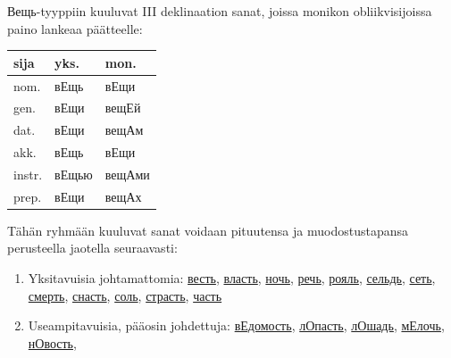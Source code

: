 \documentclass[]{scrreprt}
\providecommand{\tightlist}{%
  \setlength{\itemsep}{0pt}\setlength{\parskip}{0pt}}
\begin{document}
Вещь-tyyppiin kuuluvat III deklinaation sanat, joissa monikon
obliikvisijoissa paino lankeaa päätteelle:

\begin{longtable}[c]{@{}lll@{}}
\toprule
sija & yks. & mon.\tabularnewline
\midrule
\endhead
nom. & вЕщь & вЕщи\tabularnewline
gen. & вЕщи & вещЕй\tabularnewline
dat. & вЕщи & вещАм\tabularnewline
akk. & вЕщь & вЕщи\tabularnewline
instr. & вЕщью & вещАми\tabularnewline
prep. & вЕщи & вещАх\tabularnewline
\bottomrule
\end{longtable}

Tähän ryhmään kuuluvat sanat voidaan pituutensa ja muodostustapansa
perusteella jaotella seuraavasti:

\begin{enumerate}
\def\labelenumi{\arabic{enumi}.}
\tightlist
\item
  Yksitavuisia johtamattomia:
  \href{http://ru.wiktionary.org/wiki/\%D0\%B2\%D0\%B5\%D1\%81\%D1\%82\%D1\%8C}{весть},
  \href{http://ru.wiktionary.org/wiki/\%D0\%B2\%D0\%BB\%D0\%B0\%D1\%81\%D1\%82\%D1\%8C}{власть},
  \href{http://ru.wiktionary.org/wiki/\%D0\%BD\%D0\%BE\%D1\%87\%D1\%8C}{ночь},
  \href{http://ru.wiktionary.org/wiki/\%D1\%80\%D0\%B5\%D1\%87\%D1\%8C}{речь},
  \href{http://ru.wiktionary.org/wiki/\%D1\%80\%D0\%BE\%D1\%8F\%D0\%BB\%D1\%8C}{рояль},
  \href{http://ru.wiktionary.org/wiki/\%D1\%81\%D0\%B5\%D0\%BB\%D1\%8C\%D0\%B4\%D1\%8C}{сельдь},
  \href{http://ru.wiktionary.org/wiki/\%D1\%81\%D0\%B5\%D1\%82\%D1\%8C}{сеть},
  \href{http://ru.wiktionary.org/wiki/\%D1\%81\%D0\%BC\%D0\%B5\%D1\%80\%D1\%82\%D1\%8C}{смерть},
  \href{http://ru.wiktionary.org/wiki/\%D1\%81\%D0\%BD\%D0\%B0\%D1\%81\%D1\%82\%D1\%8C}{снасть},
  \href{http://ru.wiktionary.org/wiki/\%D1\%81\%D0\%BE\%D0\%BB\%D1\%8C}{соль},
  \href{http://ru.wiktionary.org/wiki/\%D1\%81\%D1\%82\%D1\%80\%D0\%B0\%D1\%81\%D1\%82\%D1\%8C}{страсть},
  \href{http://ru.wiktionary.org/wiki/\%D1\%87\%D0\%B0\%D1\%81\%D1\%82\%D1\%8C}{часть}
\item
  Useampitavuisia, pääosin johdettuja:
  \href{http://ru.wiktionary.org/wiki/\%D0\%B2\%D0\%B5\%D0\%B4\%D0\%BE\%D0\%BC\%D0\%BE\%D1\%81\%D1\%82\%D1\%8C}{вЕдомость},
  \href{http://ru.wiktionary.org/wiki/\%D0\%BB\%D0\%BE\%D0\%BF\%D0\%B0\%D1\%81\%D1\%82\%D1\%8C}{лОпасть},
  \href{http://ru.wiktionary.org/wiki/\%D0\%BB\%D0\%BE\%D1\%88\%D0\%B0\%D0\%B4\%D1\%8C}{лОшадь},
  \href{http://ru.wiktionary.org/wiki/\%D0\%BC\%D0\%B5\%D0\%BB\%D0\%BE\%D1\%87\%D1\%8C}{мЕлочь},
  \href{http://ru.wiktionary.org/wiki/\%D0\%BD\%D0\%BE\%D0\%B2\%D0\%BE\%D1\%81\%D1\%82\%D1\%8C}{нОвость},

\end{enumerate}
\end{document}
